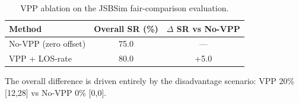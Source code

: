\begin{table}[t]
\centering
\caption{VPP ablation on the JSBSim fair-comparison evaluation.}
\label{tab:vpp_ablation}
\begin{tabular}{lcc}
\toprule
Method & Overall SR (\%) & $\Delta$ SR vs No-VPP \\
\midrule
No-VPP (zero offset) & 75.0 & --- \\
VPP + LOS-rate & 80.0 & +5.0 \\
\bottomrule
\end{tabular}
\begin{tablenotes}
\small
\item The overall difference is driven entirely by the disadvantage scenario: VPP 20\% [12,28] vs No-VPP 0\% [0,0].
\end{tablenotes}
\end{table}